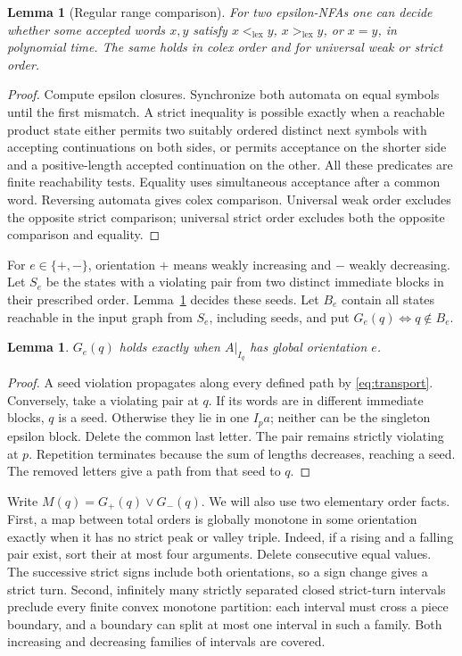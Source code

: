 \documentclass[acmsmall,screen,nonacm,11pt]{acmart}
\newcommand{\sgnset}{\{+,-\}}
\newtheorem{lemma}[theorem]{Lemma}
\theoremstyle{definition}
\begin{document}
\begin{lemma}[Regular range comparison]\label{lem:range}
For two epsilon-NFAs one can decide whether some accepted words $x,y$
satisfy $x<_{\mathrm{lex}}y$, $x>_{\mathrm{lex}}y$, or $x=y$, in polynomial
time. The same holds in colex order and for universal weak or strict order.
\end{lemma}
\begin{proof}
Compute epsilon closures. Synchronize both automata on equal symbols until
the first mismatch. A strict inequality is possible exactly when a reachable
product state either permits two suitably ordered distinct next symbols
with accepting continuations on both sides, or permits acceptance on the
shorter side and a positive-length accepted continuation on the other.
All these predicates are finite reachability tests. Equality uses simultaneous
acceptance after a common word. Reversing automata gives colex comparison.
Universal weak order excludes the opposite strict comparison; universal
strict order excludes both the opposite comparison and equality.
\end{proof}

For $e\in\sgnset$, orientation $+$ means weakly increasing and $-$ weakly
decreasing. Let $S_e$ be the states with a violating pair from two distinct
immediate blocks in their prescribed order. Lemma~\ref{lem:range} decides
these seeds. Let $B_e$ contain all states reachable in the input graph from
$S_e$, including seeds, and put $G_e(q)\iff q\notin B_e$.

\begin{lemma}\label{lem:global}
$G_e(q)$ holds exactly when $A|_{I_q}$ has global orientation $e$.
\end{lemma}
\begin{proof}
A seed violation propagates along every defined path by
\eqref{eq:transport}. Conversely, take a violating pair at $q$. If its words
are in different immediate blocks, $q$ is a seed. Otherwise they lie in one
$I_pa$; neither can be the singleton epsilon block. Delete the common last
letter. The pair remains strictly violating at $p$. Repetition terminates
because the sum of lengths decreases, reaching a seed. The removed letters
give a path from that seed to $q$.
\end{proof}

Write $M(q)=G_+(q)\lor G_-(q)$. We will also use two elementary order facts.
First, a map between total orders is globally monotone in some orientation
exactly when it has no strict peak or valley triple. Indeed, if a rising and
a falling pair exist, sort their at most four arguments. Delete consecutive
equal values. The successive strict signs include both orientations, so a
sign change gives a strict turn. Second, infinitely many strictly separated
closed strict-turn intervals preclude every finite convex monotone
partition: each interval must cross a piece boundary, and a boundary can
split at most one interval in such a family. Both increasing and decreasing
families of intervals are covered.
\end{document}
